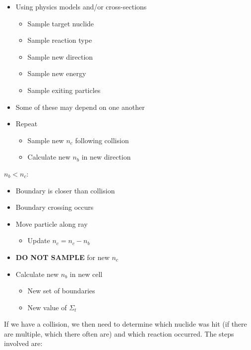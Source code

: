 \documentclass[12pt]{article}
\begin{document}
\begin{itemize}
  \item Using physics models and/or cross-sections
  \begin{itemize}
    \item Sample target nuclide
    \item Sample reaction type
    \item Sample new direction 
    \item Sample new energy 
    \item Sample exiting particles 
  \end{itemize}
  \item Some of these may depend on one another
  \vspace*{0.5 em}
  \item Repeat
  \begin{itemize}
    \item Sample new $n_c$ following collision
    \item Calculate new $n_b$ in new direction
  \end{itemize}
\end{itemize}  
  
\underline{$n_b < n_c$}:
\begin{itemize}
  \item Boundary is closer than collision
  \item Boundary crossing occurs
\end{itemize}

\begin{itemize}
  \item Move particle along ray
  \begin{itemize}
    \item Update $n_c = n_c - n_b$
  \end{itemize}
  \item \textbf{DO NOT SAMPLE} for new $n_c$
  \vspace*{1 em}
  \item Calculate new $n_b$ in new cell
  \begin{itemize}
    \item New set of boundaries
    \item New value of $\Sigma_t$
  \end{itemize}
\end{itemize}

If we have a collision, we then need to determine which nuclide was hit (if there are multiple, which there often are) and which reaction occurred.
The steps involved are:
\end{document}

